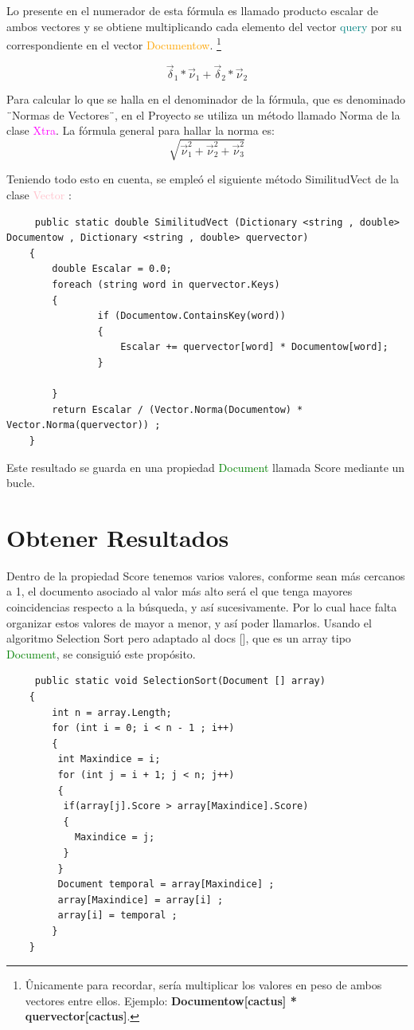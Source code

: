 \documentclass{article}
\begin{document}
Lo presente en el numerador de esta fórmula es llamado producto escalar de ambos vectores y se obtiene multiplicando cada elemento del vector \textcolor{teal}{query} por su correspondiente en el vector \textcolor{orange}{Documentow}. \footnote{Ûnicamente para recordar, sería multiplicar los valores en peso de ambos vectores entre ellos. Ejemplo: \textbf{Documentow[cactus] * quervector[cactus]}.}

\begin{equation}
\vec{\delta}_{1} * \vec{\nu}_{1} + \vec{\delta}_{2} * \vec{\nu}_{2}  
\end{equation}    

Para calcular lo que se halla en el denominador de la fórmula, que es denominado ¨Normas de Vectores¨, en el Proyecto se utiliza un método llamado Norma de la clase \textcolor{magenta}{Xtra}. La fórmula general para hallar la norma es:
\begin{equation}
    \sqrt{\vec{\nu}_{1}^2 + \vec{\nu}_{2}^2 + \vec{\nu}_{3}^2 } 
\end{equation}

Teniendo todo esto en cuenta, se empleó el siguiente método SimilitudVect de la clase \textcolor{pink}{Vector} :
\begin{lstlisting}
     public static double SimilitudVect (Dictionary <string , double> Documentow , Dictionary <string , double> quervector)
    {
        double Escalar = 0.0;
        foreach (string word in quervector.Keys)
        {
                if (Documentow.ContainsKey(word))
                {
                    Escalar += quervector[word] * Documentow[word];
                }
                
        }
        return Escalar / (Vector.Norma(Documentow) * Vector.Norma(quervector)) ;
    }
\end{lstlisting}

Este resultado se guarda en una propiedad \textcolor{green}{Document} llamada Score mediante un bucle.

\section{Obtener Resultados}
Dentro de la propiedad Score tenemos varios valores, conforme sean más cercanos a 1, el documento asociado al valor más alto será el que tenga mayores coincidencias respecto a la búsqueda, y así sucesivamente. Por lo cual hace falta organizar estos valores de mayor a menor, y así poder llamarlos.
Usando el algoritmo Selection Sort pero adaptado al docs [], que es un array tipo \textcolor{green}{Document}, se consiguió este propósito.
\begin{lstlisting}
     public static void SelectionSort(Document [] array)
    {
        int n = array.Length;
        for (int i = 0; i < n - 1 ; i++)
        {
         int Maxindice = i;
         for (int j = i + 1; j < n; j++)
         {
          if(array[j].Score > array[Maxindice].Score)
          {
            Maxindice = j;
          }  
         } 
         Document temporal = array[Maxindice] ;
         array[Maxindice] = array[i] ;
         array[i] = temporal ; 
        }
    }

\end{lstlisting}
\end{document}
